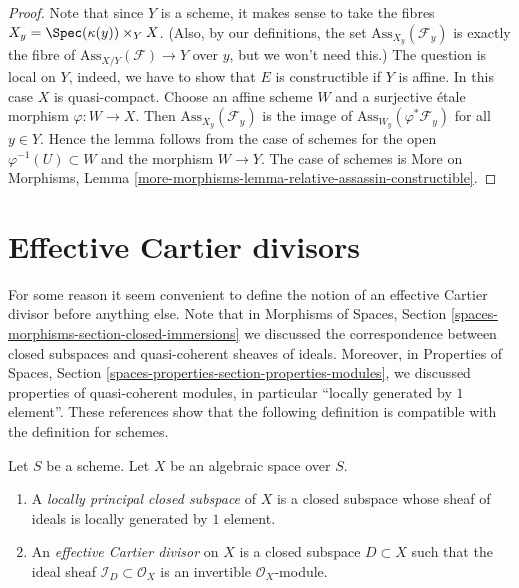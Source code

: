 \begin{proof}
Note that since $Y$ is a scheme, it makes sense to take the fibres
$X_y = \Spec(\kappa(y)) \times_Y X$. (Also, by our definitions, the
set $\text{Ass}_{X_y}(\mathcal{F}_y)$ is exactly the fibre of
$\text{Ass}_{X/Y}(\mathcal{F}) \to Y$ over $y$, but we won't need this.)
The question is local on $Y$, indeed, we have to show that
$E$ is constructible if $Y$ is affine.
In this case $X$ is quasi-compact. Choose an affine scheme $W$
and a surjective \'etale morphism $\varphi : W \to X$.
Then $\text{Ass}_{X_y}(\mathcal{F}_y)$ is the image of
$\text{Ass}_{W_y}(\varphi^*\mathcal{F}_y)$ for all $y \in Y$.
Hence the lemma follows from the case of schemes for
the open $\varphi^{-1}(U) \subset W$ and the morphism $W \to Y$.
The case of schemes is
More on Morphisms, Lemma
\ref{more-morphisms-lemma-relative-assassin-constructible}.
\end{proof}










\section{Effective Cartier divisors}
\label{section-effective-Cartier-divisors}

\noindent
For some reason it seem convenient to define the notion of an effective
Cartier divisor before anything else. Note that in
Morphisms of Spaces, Section \ref{spaces-morphisms-section-closed-immersions}
we discussed the correspondence between closed subspaces and quasi-coherent
sheaves of ideals. Moreover, in
Properties of Spaces, Section
\ref{spaces-properties-section-properties-modules}, we discussed properties
of quasi-coherent modules, in particular ``locally generated by $1$ element''.
These references show that the following definition is
compatible with the definition for schemes.

\begin{definition}
\label{definition-effective-Cartier-divisor}
Let $S$ be a scheme. Let $X$ be an algebraic space over $S$.
\begin{enumerate}
\item A {\it locally principal closed subspace} of $X$ is a closed subspace
whose sheaf of ideals is locally generated by $1$ element.
\item An {\it effective Cartier divisor} on $X$ is a closed subspace
$D \subset X$ such that the ideal sheaf $\mathcal{I}_D \subset \mathcal{O}_X$
is an invertible $\mathcal{O}_X$-module.
\end{enumerate}
\end{definition}

